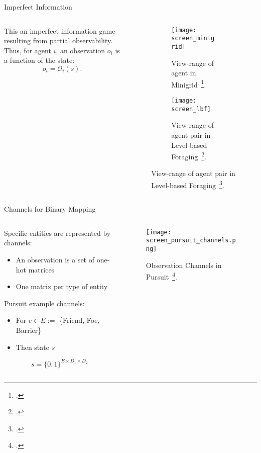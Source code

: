 \begin{frame}{Imperfect Information}
    \begin{columns}
        \begin{column}{0.4\linewidth}
            This an imperfect information game resulting from partial observability.
            \\[1em]
            Thus, for agent \(i\), an observation \(o_i\) is a function of the state:
            \[o_i = \mathcal{O}_i(s) .\]
        \end{column}
        \begin{column}{0.5\linewidth}
            \begin{figure}
                \begin{subfigure}[t]{0.45\textwidth}
                    \texttt{[image: screen\_minigrid]}
                    \caption{View-range of agent in Minigrid~\footcite{chevalier-boisvert2023}.}
                \end{subfigure}
                \hfill
                \begin{subfigure}[t]{0.45\textwidth}
                    \texttt{[image: screen\_lbf]}
                    \caption{View-range of agent pair in Level-based Foraging~\footcite{papoudakis2021}.}
                \end{subfigure}
            \end{figure}
        \end{column}
    \end{columns}
\end{frame}

\begin{frame}{Channels for Binary Mapping}
    \begin{columns}
        \begin{column}{0.6\linewidth}
            Specific entities are represented by channels:
                \begin{itemize}
                    \item An observation is a set of one-hot matrices
                    \item One matrix per type of entity
                \end{itemize}
            Pursuit example channels:
                \begin{itemize}
                    \item For \(e\in E :=\) \{Friend, Foe, Barrier\}
                    \item Then state \(s\)
                \end{itemize}
                \[s = \{0,1\}^{E\times D_1\times D_2}\]
        \end{column}
        \begin{column}{0.4\linewidth}
            \begin{figure}
                \texttt{[image: screen\_pursuit\_channels.png]}
                \caption{Observation Channels in Pursuit~\footcite{gupta2017}.}
            \end{figure}
            \centering
        \end{column}
    \end{columns}
\end{frame}

